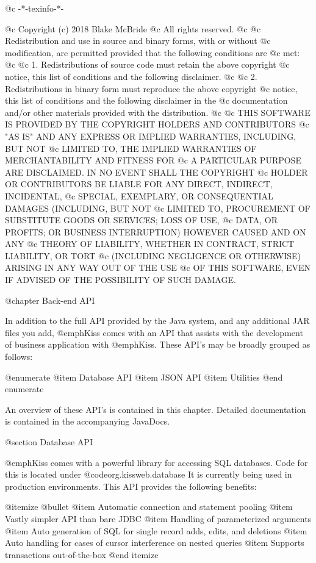 @c -*-texinfo-*-

@c  Copyright (c) 2018 Blake McBride
@c  All rights reserved.
@c
@c  Redistribution and use in source and binary forms, with or without
@c  modification, are permitted provided that the following conditions are
@c  met:
@c
@c  1. Redistributions of source code must retain the above copyright
@c  notice, this list of conditions and the following disclaimer.
@c
@c  2. Redistributions in binary form must reproduce the above copyright
@c  notice, this list of conditions and the following disclaimer in the
@c  documentation and/or other materials provided with the distribution.
@c
@c  THIS SOFTWARE IS PROVIDED BY THE COPYRIGHT HOLDERS AND CONTRIBUTORS
@c  "AS IS" AND ANY EXPRESS OR IMPLIED WARRANTIES, INCLUDING, BUT NOT
@c  LIMITED TO, THE IMPLIED WARRANTIES OF MERCHANTABILITY AND FITNESS FOR
@c  A PARTICULAR PURPOSE ARE DISCLAIMED. IN NO EVENT SHALL THE COPYRIGHT
@c  HOLDER OR CONTRIBUTORS BE LIABLE FOR ANY DIRECT, INDIRECT, INCIDENTAL,
@c  SPECIAL, EXEMPLARY, OR CONSEQUENTIAL DAMAGES (INCLUDING, BUT NOT
@c  LIMITED TO, PROCUREMENT OF SUBSTITUTE GOODS OR SERVICES; LOSS OF USE,
@c  DATA, OR PROFITS; OR BUSINESS INTERRUPTION) HOWEVER CAUSED AND ON ANY
@c  THEORY OF LIABILITY, WHETHER IN CONTRACT, STRICT LIABILITY, OR TORT
@c  (INCLUDING NEGLIGENCE OR OTHERWISE) ARISING IN ANY WAY OUT OF THE USE
@c  OF THIS SOFTWARE, EVEN IF ADVISED OF THE POSSIBILITY OF SUCH DAMAGE.


@chapter Back-end API

In addition to the full API provided by the Java system, and any additional
JAR files you add, @emph{Kiss} comes with an API that assists with the
development of business application with @emph{Kiss}.  These 
API's may be broadly grouped as follows:

@enumerate
@item
Database API
@item
JSON API
@item
Utilities
@end enumerate

An overview of these API's is contained in this chapter.  Detailed
documentation is contained in the accompanying JavaDocs.

@section Database API

@emph{Kiss} comes with a powerful library for accessing SQL databases.
Code for this is located under @code{org.kissweb.database} It is
currently being used in production environments.  This API provides
the following benefits:

@itemize @bullet
@item
Automatic connection and statement pooling
@item
Vastly simpler API than bare JDBC
@item
Handling of parameterized arguments
@item 
Auto generation of SQL for single record adds, edits, and deletions
@item
Auto handling for cases of cursor interference on nested queries
@item
Supports transactions out-of-the-box
@end itemize

